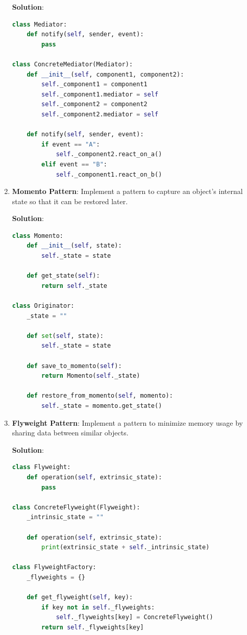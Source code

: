 \documentclass[12pt]{book}
\begin{document}
\begin{enumerate}
    \textbf{Solution}:
    \begin{lstlisting}[language=Python]
class Mediator:
    def notify(self, sender, event):
        pass

class ConcreteMediator(Mediator):
    def __init__(self, component1, component2):
        self._component1 = component1
        self._component1.mediator = self
        self._component2 = component2
        self._component2.mediator = self

    def notify(self, sender, event):
        if event == "A":
            self._component2.react_on_a()
        elif event == "B":
            self._component1.react_on_b()
    \end{lstlisting}

    \item \textbf{Momento Pattern}: Implement a pattern to capture an object's internal state so that it can be restored later.

    \textbf{Solution}:
    \begin{lstlisting}[language=Python]
class Momento:
    def __init__(self, state):
        self._state = state

    def get_state(self):
        return self._state

class Originator:
    _state = ""

    def set(self, state):
        self._state = state

    def save_to_momento(self):
        return Momento(self._state)

    def restore_from_momento(self, momento):
        self._state = momento.get_state()
    \end{lstlisting}

    \item \textbf{Flyweight Pattern}: Implement a pattern to minimize memory usage by sharing data between similar objects.

    \textbf{Solution}:
    \begin{lstlisting}[language=Python]
class Flyweight:
    def operation(self, extrinsic_state):
        pass

class ConcreteFlyweight(Flyweight):
    _intrinsic_state = ""

    def operation(self, extrinsic_state):
        print(extrinsic_state + self._intrinsic_state)

class FlyweightFactory:
    _flyweights = {}

    def get_flyweight(self, key):
        if key not in self._flyweights:
            self._flyweights[key] = ConcreteFlyweight()
        return self._flyweights[key]
    \end{lstlisting}


\end{enumerate}
\end{document}
